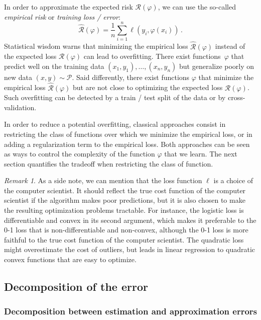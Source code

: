 \documentclass[11pt,reqno]{article}
\newcommand{\cP}{\mathcal{P}}
\newcommand{\cR}{\mathcal{R}}
\numberwithin{equation}{section}
\theoremstyle{plain}
\theoremstyle{definition}
\theoremstyle{remark}
\newtheorem{remark}[assumption]{Remark}
\begin{document}
In order to approximate the expected risk $\cR(\varphi)$, we can use the so-called \emph{empirical risk} or \emph{training loss / error}:
\begin{equation*}
	\widehat{\cR}(\varphi) = \frac{1}{n} \sum_{i=1}^n \ell(y_i, \varphi(x_i)) \, .
\end{equation*}
Statistical wisdom warns that minimizing the empirical loss $\widehat{\cR}(\varphi)$ instead of the expected loss $\cR(\varphi)$ can lead to overfitting. There exist functions~$\varphi$ that predict well on the training data $(x_1, y_1), \dots, (x_n, y_n)$ but generalize poorly on new data $(x,y) \sim \cP$. Said differently, there exist functions $\varphi$ that minimize the empirical loss $\widehat{\cR}(\varphi)$ but are not close to optimizing the expected loss $\cR(\varphi)$. Such overfitting can be detected by a train / test split of the data or by cross-validation.

In order to reduce a potential overfitting, classical approaches consist in restricting the class of functions over which we minimize the empirical loss, or in adding a regularization term to the empirical loss. Both approaches can be seen as ways to control the complexity of the function $\varphi$ that we learn. The next section quantifies the tradeoff when restricting the class of function.

\begin{remark}
	\label{rmk:convexification}
	As a side note, we can mention that the loss function $\ell$ is a choice of the computer scientist. It should reflect the true cost function of the computer scientist if the algorithm makes poor predictions, but it is also chosen to make the resulting optimization problems tractable. For instance, the logistic loss is differentiable and convex in its second argument, which makes it preferable to the 0-1 loss that is non-differentiable and non-convex, although the 0-1 loss is more faithful to the true cost function of the computer scientist. The quadratic loss might overestimate the cost of outliers, but leads in linear regression to quadratic convex functions that are easy to optimize. 
\end{remark}


\subsection{Decomposition of the error}

\subsubsection{Decomposition between estimation and approximation errors}
\end{document}
